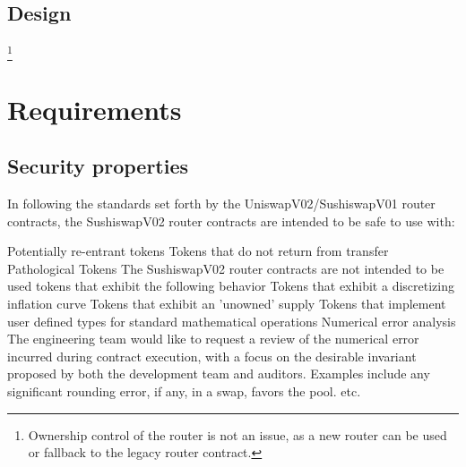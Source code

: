 \documentclass[runningheads]{llncs}
\begin{document}
\subsection{Design}
\footnote{Ownership control of the router is not an issue, as a new router can be used or fallback to the legacy router contract.}


\newpage
\section{Requirements}

\subsection{Security properties}

In following the standards set forth by the UniswapV02/SushiswapV01 router contracts, the SushiswapV02 router contracts are intended to be safe to use with:

Potentially re-entrant tokens
Tokens that do not return from transfer
Pathological Tokens The SushiswapV02 router contracts are not intended to be used tokens that exhibit the following behavior
Tokens that exhibit a discretizing inflation curve
Tokens that exhibit an 'unowned' supply
Tokens that implement user defined types for standard mathematical operations
Numerical error analysis The engineering team would like to request a review of the numerical error incurred during contract execution, with a focus on the desirable invariant proposed by both the development team and auditors. Examples include any significant rounding error, if any, in a swap, favors the pool. etc.
\end{document}
